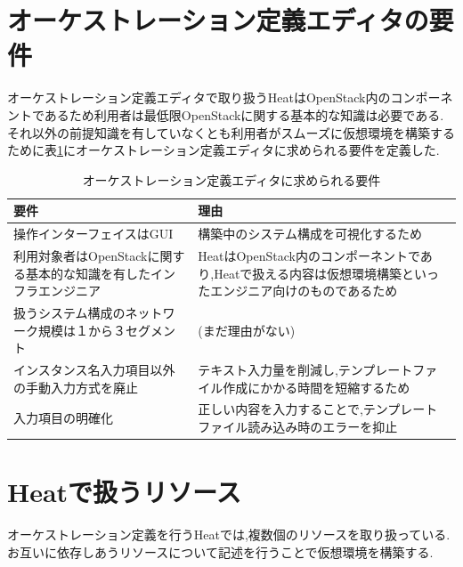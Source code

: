 \documentclass[mingoth]{kut-paper}		%
\begin{document}
	\section{オーケストレーション定義エディタの要件}
	オーケストレーション定義エディタで取り扱うHeatはOpenStack内のコンポーネントであるため利用者は最低限OpenStackに関する基本的な知識は必要である.それ以外の前提知識を有していなくとも利用者がスムーズに仮想環境を構築するために表\ref{table:3}にオーケストレーション定義エディタに求められる要件を定義した.
	\begin{table}[H]
		\begin{center}
			\caption{オーケストレーション定義エディタに求められる要件}
			\label{table:3}
			\begin{tabular}{|p{5cm}|p{7cm}|}\hline
				要件 & 理由\\ \hline \hline
				操作インターフェイスはGUI & 構築中のシステム構成を可視化するため\\ \hline
				利用対象者はOpenStackに関する基本的な知識を有したインフラエンジニア & HeatはOpenStack内のコンポーネントであり,Heatで扱える内容は仮想環境構築といったエンジニア向けのものであるため\\ \hline
				扱うシステム構成のネットワーク規模は１から３セグメント & (まだ理由がない)\\ \hline
				インスタンス名入力項目以外の手動入力方式を廃止 & テキスト入力量を削減し,テンプレートファイル作成にかかる時間を短縮するため\\ \hline
				入力項目の明確化 & 正しい内容を入力することで,テンプレートファイル読み込み時のエラーを抑止\\ \hline
			\end{tabular}
		\end{center}
	\end{table}
	\section{Heatで扱うリソース}
	オーケストレーション定義を行うHeatでは,複数個のリソースを取り扱っている.お互いに依存しあうリソースについて記述を行うことで仮想環境を構築する.
	
\end{document}
